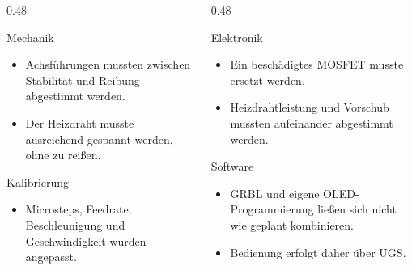 {
  \begin{columns}[T]
    \begin{column}{0.48\textwidth}
      \begin{block}{Mechanik}
        \begin{itemize}
          \item Achsführungen mussten zwischen Stabilität und Reibung abgestimmt werden.
          \item Der Heizdraht musste ausreichend gespannt werden, ohne zu reißen.
        \end{itemize}
      \end{block}
      \begin{block}{Kalibrierung}
        \begin{itemize}
          \item Microsteps, Feedrate, Beschleunigung und Geschwindigkeit wurden angepasst.
        \end{itemize}
      \end{block}
    \end{column}
    \begin{column}{0.48\textwidth}
      \begin{block}{Elektronik}
        \begin{itemize}
          \item Ein beschädigtes MOSFET musste ersetzt werden.
          \item Heizdrahtleistung und Vorschub mussten aufeinander abgestimmt werden.
        \end{itemize}
      \end{block}
      \begin{block}{Software}
        \begin{itemize}
          \item GRBL und eigene OLED-Programmierung ließen sich nicht wie geplant kombinieren.
          \item Bedienung erfolgt daher über UGS.
        \end{itemize}
      \end{block}
    \end{column}
  \end{columns}
}


